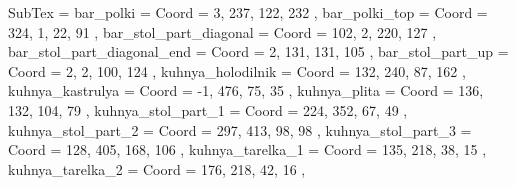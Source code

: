 SubTex = {
	bar_polki								= { Coord = { 3, 237, 122, 232 } },
	bar_polki_top								= { Coord = { 324, 1, 22, 91 } },
	bar_stol_part_diagonal								= { Coord = { 102, 2, 220, 127 } },
	bar_stol_part_diagonal_end								= { Coord = { 2, 131, 131, 105 } },
	bar_stol_part_up								= { Coord = { 2, 2, 100, 124 } },
	kuhnya_holodilnik								= { Coord = { 132, 240, 87, 162 } },
	kuhnya_kastrulya								= { Coord = { -1, 476, 75, 35 } },
	kuhnya_plita								= { Coord = { 136, 132, 104, 79 } },
	kuhnya_stol_part_1								= { Coord = { 224, 352, 67, 49 } },
	kuhnya_stol_part_2								= { Coord = { 297, 413, 98, 98 } },
	kuhnya_stol_part_3								= { Coord = { 128, 405, 168, 106 } },
	kuhnya_tarelka_1								= { Coord = { 135, 218, 38, 15 } },
	kuhnya_tarelka_2								= { Coord = { 176, 218, 42, 16 } },
}
